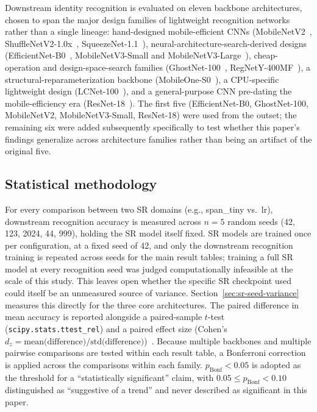 \documentclass[11pt]{article}
\begin{document}
Downstream identity recognition is evaluated on eleven backbone architectures, chosen to span the major design families of lightweight recognition networks rather than a single lineage: hand-designed mobile-efficient CNNs (MobileNetV2~\cite{sandler2018mobilenetv2}, ShuffleNetV2-1.0x~\cite{ma2018shufflenetv2}, SqueezeNet-1.1~\cite{iandola2016squeezenet}), neural-architecture-search-derived designs (EfficientNet-B0~\cite{tan2019efficientnet}, MobileNetV3-Small and MobileNetV3-Large~\cite{howard2019mobilenetv3}), cheap-operation and design-space-search families (GhostNet-100~\cite{han2020ghostnet}, RegNetY-400MF~\cite{radosavovic2020regnet}), a structural-reparameterization backbone (MobileOne-S0~\cite{vasu2023mobileone}), a CPU-specific lightweight design (LCNet-100~\cite{cui2021lcnet}), and a general-purpose CNN pre-dating the mobile-efficiency era (ResNet-18~\cite{he2016resnet}). The first five (EfficientNet-B0, GhostNet-100, MobileNetV2, MobileNetV3-Small, ResNet-18) were used from the outset; the remaining six were added subsequently specifically to test whether this paper's findings generalize across architecture families rather than being an artifact of the original five.

\subsection{Statistical methodology}
\label{sec:stats}

For every comparison between two SR domains (e.g., span\_tiny vs.\ lr), downstream recognition accuracy is measured across $n=5$ random seeds (42, 123, 2024, 44, 999), holding the SR model itself fixed. SR models are trained once per configuration, at a fixed seed of 42, and only the downstream recognition training is repeated across seeds for the main result tables; training a full SR model at every recognition seed was judged computationally infeasible at the scale of this study. This leaves open whether the specific SR checkpoint used could itself be an unmeasured source of variance. Section~\ref{sec:sr-seed-variance} measures this directly for the three core architectures. The paired difference in mean accuracy is reported alongside a paired-sample $t$-test (\texttt{scipy.stats.ttest\_rel}) and a paired effect size (Cohen's $d_z = \text{mean(difference)}/\text{std(difference)}$)~\cite{cohen1988statistical}. Because multiple backbones and multiple pairwise comparisons are tested within each result table, a Bonferroni correction~\cite{dunn1961multiple} is applied across the comparisons within each family. $p_{\text{Bonf}} < 0.05$ is adopted as the threshold for a ``statistically significant'' claim, with $0.05 \leq p_{\text{Bonf}} < 0.10$ distinguished as ``suggestive of a trend'' and never described as significant in this paper.
\end{document}
